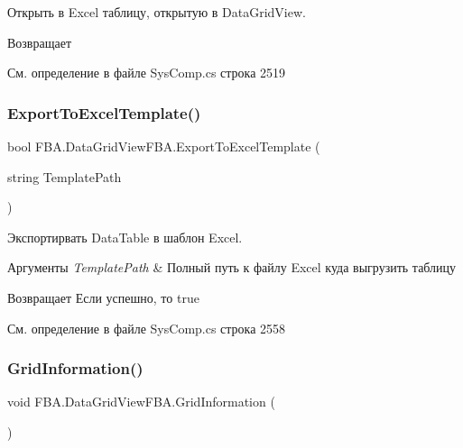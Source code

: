 Открыть в Excel таблицу, открытую в Data\+Grid\+View. 

\begin{DoxyReturn}{Возвращает}

\end{DoxyReturn}


См. определение в файле Sys\+Comp.\+cs строка 2519

\mbox{\label{class_f_b_a_1_1_data_grid_view_f_b_a_a4fa4c76ee8e291f78141ae2ce627445b}} 
\subsubsection{\texorpdfstring{Export\+To\+Excel\+Template()}{ExportToExcelTemplate()}}
{\footnotesize\ttfamily bool F\+B\+A.\+Data\+Grid\+View\+F\+B\+A.\+Export\+To\+Excel\+Template (\begin{DoxyParamCaption}\item[{string}]{Template\+Path }\end{DoxyParamCaption})}



Экспортирвать Data\+Table в шаблон Excel. 


\begin{DoxyParams}{Аргументы}
{\em Template\+Path} & Полный путь к файлу Excel куда выгрузить таблицу\\
\hline
\end{DoxyParams}
\begin{DoxyReturn}{Возвращает}
Если успешно, то true
\end{DoxyReturn}


См. определение в файле Sys\+Comp.\+cs строка 2558

\mbox{\label{class_f_b_a_1_1_data_grid_view_f_b_a_a0d5348dea70a61d7eda6e96e7273b7ef}} 
\subsubsection{\texorpdfstring{Grid\+Information()}{GridInformation()}}
{\footnotesize\ttfamily void F\+B\+A.\+Data\+Grid\+View\+F\+B\+A.\+Grid\+Information (\begin{DoxyParamCaption}{ }\end{DoxyParamCaption})}



